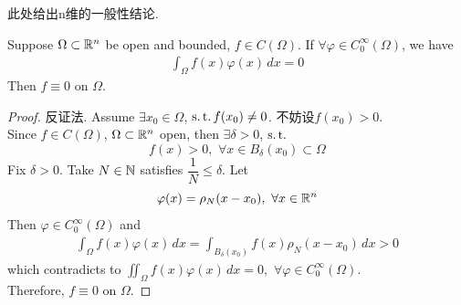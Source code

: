 	\newpage
	
	此处给出n维的一般性结论. 
	
	\begin{lemma}\label{lemma A.1.1}
		Suppose $\Omega \subset \mathbb{R}^n$ be open and bounded, $f \in C(\Omega)$. If $\forall \varphi \in C_{0}^{\infty} (\Omega)$, we have 
		\begin{align*}
			\int_{\Omega} f(x) \varphi(x) \, dx = 0
		\end{align*}
		Then $f \equiv 0$ on $\Omega$. 
		
		\vspace*{8em}
		
		\begin{proof}
			反证法. Assume $\exists x_0 \in \Omega$, $\operatorname{s.t.} f(x_0) \neq 0$. 不妨设$f(x_0) > 0$. \\
			Since $f \in C(\Omega)$, $\Omega \subset \mathbb{R}^n$ open, then $\exists \delta > 0$, $\operatorname{s.t.}$
			\[ f(x) > 0 , \,\, \forall x \in B_{\delta}(x_0) \subset \Omega \]
			Fix $\delta > 0$. Take $N \in \mathbb{N}$ satisfies $\dfrac{1}{N} \leq \delta$. Let
			\[ \varphi(x) = \rho_{N}(x - x_0) , \,\, \forall x \in \mathbb{R}^n \]
			Then $\varphi \in C_{0}^{\infty}(\Omega)$ and
			\begin{align*}
				\int_{\Omega} f(x) \varphi(x) \, dx 
				= \int_{B_{\delta}(x_0)} f(x) \rho_{N}(x - x_0) \, dx 
				> 0
			\end{align*}
			which contradicts to $\iint_{\Omega} f(x) \varphi(x) \, dx = 0 , \,\, \forall \varphi \in C_{0}^{\infty} (\Omega)$. \\
			Therefore, $f \equiv 0$ on $\Omega$. 
		\end{proof}
	\end{lemma}

\newpage

